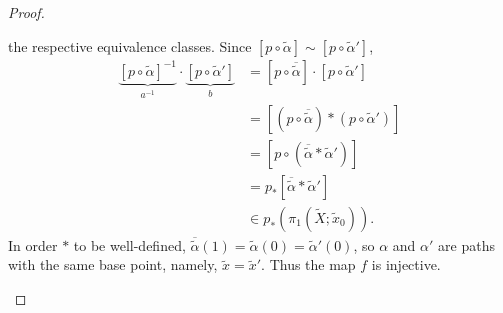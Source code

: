 \documentclass{article}
\begin{document}
\begin{proof}
\begin{enumerate}[a.]
    the respective equivalence classes.
    Since $[p \circ \widetilde \alpha] \sim [p \circ \widetilde \alpha']$,
    \begin{align*}
        \underbrace{[p \circ \widetilde \alpha]^{-1}}_{a^{-1}} \cdot
        \underbrace{[p \circ \widetilde \alpha']}_{b}
        &= [p \circ \overline{\widetilde \alpha}] \cdot [p \circ \widetilde \alpha'] \\
        &= [(p \circ \overline{\widetilde \alpha}) * (p \circ \widetilde \alpha')] \\
        &= [p \circ (\overline{\widetilde \alpha} * \widetilde \alpha')] \\
        &= p_*[\overline{\widetilde \alpha} * \widetilde \alpha'] \\
        &\in p_*(\pi_1(\widetilde X; \widetilde x_0)).
    \end{align*}
    In order $*$ to be well-defined,
    $\overline{\widetilde \alpha}(1) = \widetilde \alpha(0) = \widetilde \alpha'(0)$,
    so $\alpha$ and $\alpha'$ are paths with the same base point, namely,
    $\widetilde x = \widetilde x'$. Thus the map $f$ is injective.
  \end{enumerate}
\end{proof}
\end{document}
